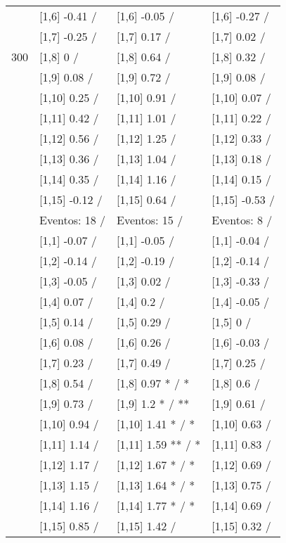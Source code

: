 \begin{table}
\begin{tabular}[t]{llll}
 & {}[1,6] -0.41  / & {}[1,6] -0.05  / & {}[1,6] -0.27  /\\
 & {}[1,7] -0.25  / & {}[1,7] 0.17  / & {}[1,7] 0.02  /\\
300 & {}[1,8] 0  / & {}[1,8] 0.64  / & {}[1,8] 0.32  /\\
\addlinespace
 & {}[1,9] 0.08  / & {}[1,9] 0.72  / & {}[1,9] 0.08  /\\
 & {}[1,10] 0.25  / & {}[1,10] 0.91  / & {}[1,10] 0.07  /\\
 & {}[1,11] 0.42  / & {}[1,11] 1.01  / & {}[1,11] 0.22  /\\
 & {}[1,12] 0.56  / & {}[1,12] 1.25  / & {}[1,12] 0.33  /\\
 & {}[1,13] 0.36  / & {}[1,13] 1.04  / & {}[1,13] 0.18  /\\
\addlinespace
 & {}[1,14] 0.35  / & {}[1,14] 1.16  / & {}[1,14] 0.15  /\\
 & {}[1,15] -0.12  / & {}[1,15] 0.64  / & {}[1,15] -0.53  /\\
 & Eventos:  18 / & Eventos:  15 / & Eventos:  8 /\\
 & {}[1,1] -0.07  / & {}[1,1] -0.05  / & {}[1,1] -0.04  /\\
 & {}[1,2] -0.14  / & {}[1,2] -0.19  / & {}[1,2] -0.14  /\\
\addlinespace
 & {}[1,3] -0.05  / & {}[1,3] 0.02  / & {}[1,3] -0.33  /\\
 & {}[1,4] 0.07  / & {}[1,4] 0.2  / & {}[1,4] -0.05  /\\
 & {}[1,5] 0.14  / & {}[1,5] 0.29  / & {}[1,5] 0  /\\
 & {}[1,6] 0.08  / & {}[1,6] 0.26  / & {}[1,6] -0.03  /\\
 & {}[1,7] 0.23  / & {}[1,7] 0.49  / & {}[1,7] 0.25  /\\
\addlinespace
500 & {}[1,8] 0.54  / & {}[1,8] 0.97 * / * & {}[1,8] 0.6  /\\
 & {}[1,9] 0.73  / & {}[1,9] 1.2 * / ** & {}[1,9] 0.61  /\\
 & {}[1,10] 0.94  / & {}[1,10] 1.41 * / * & {}[1,10] 0.63  /\\
 & {}[1,11] 1.14  / & {}[1,11] 1.59 ** / * & {}[1,11] 0.83  /\\
 & {}[1,12] 1.17  / & {}[1,12] 1.67 * / * & {}[1,12] 0.69  /\\
\addlinespace
 & {}[1,13] 1.15  / & {}[1,13] 1.64 * / * & {}[1,13] 0.75  /\\
 & {}[1,14] 1.16  / & {}[1,14] 1.77 * / * & {}[1,14] 0.69  /\\
 & {}[1,15] 0.85  / & {}[1,15] 1.42  / & {}[1,15] 0.32  /\\
\bottomrule
\end{tabular}
\end{table}
